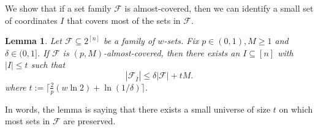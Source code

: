 \documentclass{article}
\newtheorem{lemma}[lemma]{Lemma}
\newcommand{\<}{\langle}
\renewcommand{\>}{\rangle}
\newcommand{\calF}{\mathcal{F}}
\newcommand{\calS}{\mathcal{S}}
\newcommand{\shachar}[1]{\textcolor{blue}{(Shachar: {#1})}}
\newcommand{\ignore}[1]{{}}
\begin{document}
\ignore{We need the following lemma in the proof of Theorem \ref{theorem:one-step-universe-reduction-good-sets}.
\begin{lemma}[existence of popular element]\label{lem:existence_of_popular_elements}
    Let $\calF \subseteq 2^{[n]}$ be a $(p, M)$-almost-covered family of sets. Given $I \subseteq [n]$, let $\calF':= \{S \in \calF: S \not\subset I\}$ be the sets not fully-covered by $I$. If $|\calF'| \geq 2M$, then there is some $i \in [n] \backslash I$ which is contained in at least $p/2$ fraction of sets in $\calF'$.
\end{lemma}

\begin{proof}
    Notice $\calF' = \calF_{\Bar{I}}$ \shachar{why? I don't think this is true}. Since $\calF$ is $(p, M)$-almost-covered, we know there exists an exceptional set $\calS_{\Bar{I}} \subseteq \calF_{\Bar{I}}$ with $|\calS_{\Bar{I}}| \leq M$ such that $\calF_{\Bar{I}} \backslash \calS_{\Bar{I}}$ is $p$-covered. Therefore, by the definition of $p$-coveredness,  there exists a distribution $Q$ on $\Bar{I}$ such that for all $S \in \calF_{\Bar{I}} \backslash \calS_{\Bar{I}}$, $\sum_{i \in S}Q(i) \geq p$. In particular,
    \[
    \sum_{S \in \calF_{\Bar{I}} \backslash \calS_{\Bar{I}}}\sum_{i \in S}Q(i) \geq p \cdot |\calF_{\Bar{I}} \backslash \calS_{\Bar{I}}| \geq p \cdot \frac{|\calF'|}{2}.
    \]
    On the other hand, switching the order of summation, we find \shachar{why use sum over 1s instead of set size?}
    \[
     p \cdot \frac{|\calF'|}{2} \leq \sum_{S \in \calF_{\Bar{I}} \backslash \calS_{\Bar{I}}}\sum_{i \in S}Q(i) = \sum_{i \in \Bar{I}}Q(i) \left(\sum_{S \in \calF_{\Bar{I}} \backslash \calS_{\Bar{I}}: i \in S}1 \right)
    \]
    Since $\sum_{i \in |I|}Q(i) = 1$, there must exist an $i \in \Bar{I}$ such that 
    \[
    \sum_{S \in \calF_{\Bar{I}} \backslash \calS_{\Bar{I}}: i \in S}1 \geq p \cdot \frac{|\calF'|}{2},
    \]
    as desired.
\end{proof}
}


We show that if a set family $\calF$ is almost-covered, then we can identify a small set of coordinates $I$ that covers most of the sets in $\calF$.

\begin{lemma}\label{lemma:one-step-universe-reduction-good-sets}
    Let $\calF \subseteq 2^{[n]}$ be a family of $w$-sets. Fix $p \in (0, 1), M \geq 1$ and $\delta \in (0, 1]$. If $\calF$ is $(p, M)$-almost-covered, then there exists an $I \subseteq [n]$ with $|I| \leq t $ such that 
    \[
    |\mathcal F_{\overline I}|
    \le
    \delta|\mathcal F|+tM.
    \]
    where $t:= \lceil \frac{2}{p}(w \ln 2) + \ln (1/\delta) \rceil$.
\end{lemma}
In words, the lemma is saying that there exists a small universe of size $t$ on which most sets in $\calF$ are preserved. 
\end{document}
